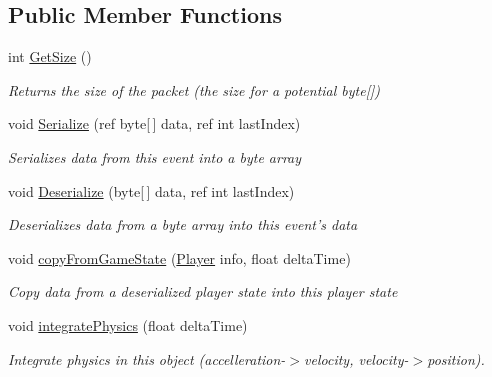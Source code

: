 \subsection*{Public Member Functions}
\begin{DoxyCompactItemize}
\item 
int \hyperlink{class_game_state_1_1_player_a58e1b4e7eaca487703abf36826e41c45}{Get\-Size} ()
\begin{DoxyCompactList}\small\item\em Returns the size of the packet (the size for a potential byte\mbox{[}\mbox{]}) \end{DoxyCompactList}\item 
void \hyperlink{class_game_state_1_1_player_aa8df830f0a0bcfbfb263a634d125c3a5}{Serialize} (ref byte\mbox{[}$\,$\mbox{]} data, ref int last\-Index)
\begin{DoxyCompactList}\small\item\em Serializes data from this event into a byte array \end{DoxyCompactList}\item 
void \hyperlink{class_game_state_1_1_player_aaf7c5b93f45be35c3501626cb6759c0b}{Deserialize} (byte\mbox{[}$\,$\mbox{]} data, ref int last\-Index)
\begin{DoxyCompactList}\small\item\em Deserializes data from a byte array into this event's data \end{DoxyCompactList}\item 
void \hyperlink{class_game_state_1_1_player_ace7e3625cf1996b8c56bcafae36673af}{copy\-From\-Game\-State} (\hyperlink{class_game_state_1_1_player}{Player} info, float delta\-Time)
\begin{DoxyCompactList}\small\item\em Copy data from a deserialized player state into this player state \end{DoxyCompactList}\item 
void \hyperlink{class_game_state_1_1_player_a59ac624b5378e8253ac70d827febfe6a}{integrate\-Physics} (float delta\-Time)
\begin{DoxyCompactList}\small\item\em Integrate physics in this object (accelleration-\/$>$velocity, velocity-\/$>$position). \end{DoxyCompactList}\end{DoxyCompactItemize}
